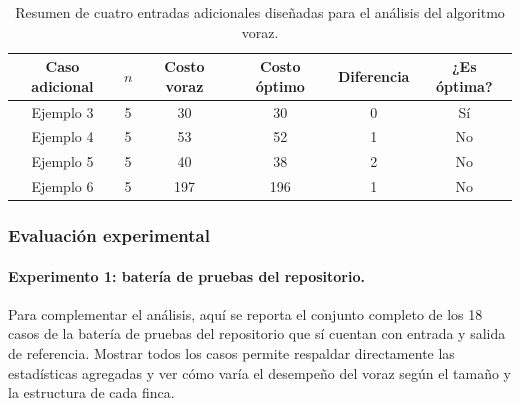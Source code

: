 \documentclass[12pt,a4paper]{article}
\begin{document}
\begin{table}[ht]
  \centering
  \small
  \begin{tabular}{cccccc}
    \toprule
    Caso adicional & \(n\) & Costo voraz & Costo \'optimo & Diferencia & ¿Es \'optima? \\
    \midrule
    Ejemplo 3 & 5 & 30 & 30 & 0 & S\'i \\
    Ejemplo 4 & 5 & 53 & 52 & 1 & No \\
    Ejemplo 5 & 5 & 40 & 38 & 2 & No \\
    Ejemplo 6 & 5 & 197 & 196 & 1 & No \\
    \bottomrule
\end{tabular}
  \caption{Resumen de cuatro entradas adicionales dise\~nadas para el an\'alisis del algoritmo voraz.}
\end{table}

\subsubsection{Evaluaci\'on experimental}

\paragraph{Experimento 1: bater\'ia de pruebas del repositorio.}
Para complementar el an\'alisis, aqu\'i se reporta el conjunto completo de los 18 casos de la bater\'ia de pruebas del repositorio que s\'i cuentan con entrada y salida de referencia. Mostrar todos los casos permite respaldar directamente las estad\'isticas agregadas y ver c\'omo var\'ia el desempe\~no del voraz seg\'un el tama\~no y la estructura de cada finca.

\medskip
\end{document}
